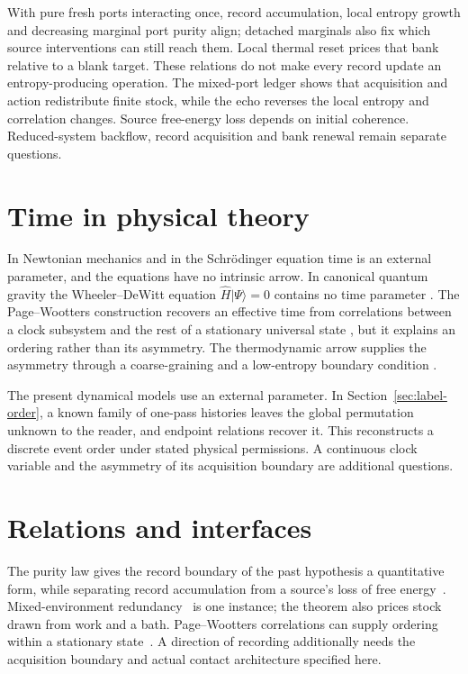 \documentclass[12pt,a4paper]{article}
\begin{document}
With pure fresh ports interacting once, record accumulation, local entropy
growth and decreasing marginal port purity align; detached marginals
also fix which source interventions can still reach them. Local thermal
reset prices that bank relative to a blank target. These relations do not
make every record update an entropy-producing operation. The mixed-port
ledger shows that acquisition and action redistribute finite stock, while
the echo reverses the local entropy and correlation changes. Source
free-energy loss depends on initial coherence. Reduced-system backflow,
record acquisition and bank renewal remain separate questions.

\section{Time in physical theory}
\label{sec:background}

In Newtonian mechanics and in the Schr\"odinger equation time is an external parameter, and the equations have no intrinsic arrow. In canonical quantum gravity the Wheeler--DeWitt equation $\hat H|\Psi\rangle=0$ contains no time parameter \cite{DeWitt1967}. The Page--Wootters construction recovers an effective time from correlations between a clock subsystem and the rest of a stationary universal state \cite{PageWootters1983}, but it explains an ordering rather than its asymmetry. The thermodynamic arrow supplies the asymmetry through a coarse-graining and a low-entropy boundary condition \cite{Albert2000,Wallace2010}.

The present dynamical models use an external parameter. In Section~\ref{sec:label-order}, a known family of one-pass histories leaves the global permutation unknown to the reader, and endpoint relations recover it. This reconstructs a discrete event order under stated physical permissions. A continuous clock variable and the asymmetry of its acquisition boundary are additional questions.

\section{Relations and interfaces}
\label{sec:relations}
\label{sec:connection}

The purity law gives the record boundary of the past hypothesis a
quantitative form, while separating record accumulation from a source's
loss of free energy~\cite{Albert2000,Wallace2010}. Mixed-environment
redundancy~\cite{ZwolakQuanZurek2009} is one instance; the theorem also
prices stock drawn from work and a bath. Page--Wootters correlations
can supply ordering within a stationary state~\cite{PageWootters1983}.
A direction of recording additionally needs the acquisition boundary
and actual contact architecture specified here.
\end{document}
